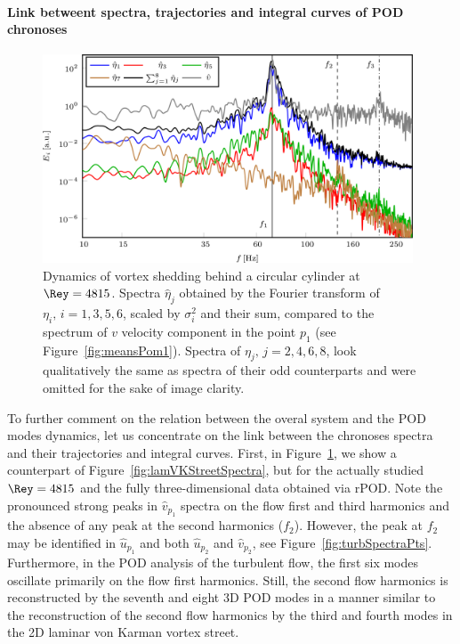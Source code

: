 \paragraph{Link betweent spectra, trajectories and integral curves of POD chronoses}
\begin{figure}[tbp]
    \centering
    \includegraphics[width=0.98\textwidth]{02_images/00_export/figure27.png}
    \caption{Dynamics of vortex shedding behind a circular cylinder at $\Rey = 4815$. Spectra $\hat{\eta}_{j}$ obtained by the Fourier transform of $\eta_{i},\,i=1,3,5,6$, scaled by $\sigma_{i}^{2}$ and their sum, compared to the spectrum of $v$ velocity component in the point $p_{1}$ (see Figure~\ref{fig:meansPom1}). Spectra of $\eta_{j},\,j=2,4,6,8$, look qualitatively the same as spectra of their odd counterparts and were omitted for the sake of image clarity.}
    \label{fig:turbVKStreetSpectra}
\end{figure}
To further comment on the relation between the overal system and the POD modes dynamics, let us concentrate on the link between the chronoses spectra and their trajectories and integral curves. First, in Figure~\ref{fig:turbVKStreetSpectra}, we show a counterpart of Figure~\ref{fig:lamVKStreetSpectra}, but for the actually studied $\Rey = 4815$ and the fully three-dimensional data obtained via rPOD. Note the pronounced strong peaks in $\hat{v}_{p_{1}}$ spectra on the flow first and third harmonics and the absence of any peak at the second harmonics ($f_{2}$). However, the peak at $f_{2}$ may be identified in $\hat{u}_{p_{1}}$ and both $\hat{u}_{p_{2}}$ and $\hat{v}_{p_{2}}$, see Figure~\ref{fig:turbSpectraPts}. Furthermore, in the POD analysis of the turbulent flow, the first six modes oscillate primarily on the flow first harmonics. Still, the second flow harmonics is reconstructed by the seventh and eight 3D POD modes in a manner similar to the reconstruction of the second flow harmonics by the third and fourth modes in the 2D laminar von Karman vortex street.

